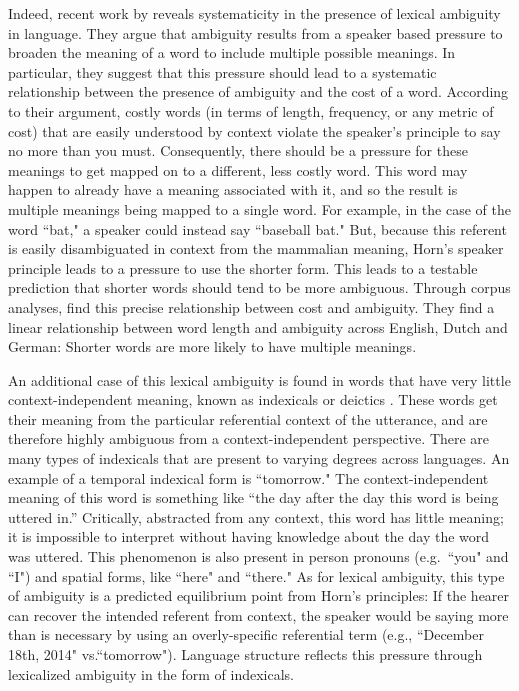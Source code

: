 \documentclass[man]{apa2}
\begin{document}
Indeed, recent work by  reveals systematicity in the presence of lexical ambiguity in language. They argue that ambiguity results from a speaker based pressure to broaden the meaning of a word to include multiple possible meanings. In particular, they suggest that this pressure should lead to a systematic relationship between the presence of ambiguity and the cost of a word. According to their argument, costly words (in terms of length, frequency, or any metric of cost) that are easily understood by context violate the speaker's principle to say no more than you must. Consequently, there should be a pressure for these meanings to get mapped on to a different, less costly word. This word may happen to already have a meaning associated with it, and so the result  is multiple meanings being mapped to a single word. For example, in the case of the word ``bat," a speaker could instead say ``baseball bat." But, because this referent is easily disambiguated in context from the mammalian meaning,  Horn's speaker principle leads to a pressure to use the shorter form. This leads to a testable prediction that shorter words should tend to be more ambiguous.  Through corpus analyses,  find this precise  relationship between cost and ambiguity. They find a linear relationship between word length and ambiguity across English, Dutch and German: Shorter words are more likely to have multiple meanings. 

An additional case of this lexical ambiguity is found in words that have very little context-independent meaning, known as indexicals or deictics \cite{frawley2003international}. These words get their meaning from the particular referential context of the utterance, and are therefore highly ambiguous from a context-independent perspective. There are many types of indexicals that are present to varying degrees across languages. An example of a temporal indexical form is ``tomorrow." The context-independent meaning of this word is something like ``the day after the day this word is being uttered in.'' Critically, abstracted from any context, this word has little meaning; it is impossible to interpret without having knowledge about the day the word was uttered. This phenomenon is also present in person pronouns (e.g.\ ``you" and ``I") and spatial forms, like ``here" and ``there."  As for lexical ambiguity, this type of ambiguity is a predicted equilibrium point from Horn's principles: If the hearer can recover the intended referent from context, the speaker would be saying more than is necessary by using an overly-specific referential term (e.g., ``December 18th, 2014" vs.``tomorrow"). Language structure reflects this pressure through lexicalized ambiguity in the form of indexicals.
\end{document}
